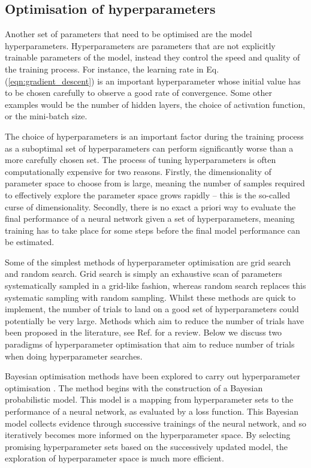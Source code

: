 \documentclass[main.tex]{subfiles}
\begin{document}
    \subsection{Optimisation of hyperparameters}
    \label{sec:hyperparameters}
    Another set of parameters that need to be optimised
    are the model hyperparameters.
    Hyperparameters are parameters that are
    not explicitly trainable parameters of the model, instead they control
    the speed and quality of the training process.
    For instance, the learning rate in Eq. ({\ref{eqn:gradient_descent}}) is
    an important hyperparameter whose initial value has
    to be chosen carefully to observe a good rate of convergence.
    Some other examples would be
    the number of hidden layers, the choice of activation
    function, or the mini-batch size.

    The choice of hyperparameters is an important
    factor during the training process as a suboptimal set
    of hyperparameters can perform significantly worse
    than a more carefully chosen set. The process of tuning
    hyperparameters is often computationally expensive for two
    reasons. Firstly, the dimensionality of parameter space to
    choose from is large, meaning the number of samples required
    to effectively explore the parameter space grows rapidly --
    this is the so-called curse of dimensionality.
    Secondly, there is no exact a priori way to evaluate the
    final performance of a neural network given a set of
    hyperparameters, meaning training has to take place for
    some steps before the final model performance can be estimated.
    
    Some of the simplest methods of hyperparameter optimisation
    are grid search and random search. Grid search is simply
    an exhaustive scan of parameters systematically sampled
    in a grid-like fashion, whereas random search replaces
    this systematic sampling with random sampling. Whilst
    these methods are quick to implement, the number of trials
    to land on a good set of hyperparameters could potentially
    be very large. Methods which aim to reduce the number
    of trials have been proposed in the literature, see Ref.
    \cite{Yu2020HyperParameterOA} for a review.
    Below we discuss two paradigms of hyperparameter optimisation
    that aim to reduce number of trials when doing hyperparameter searches.

    Bayesian optimisation methods have been explored
    to carry out hyperparameter optimisation \cite{bergstra2013making,bergstra2015hyperopt}.
    The method begins with the construction of a 
    Bayesian probabilistic model. This model is a mapping
    from hyperparameter sets to the performance
    of a neural network, as evaluated by a loss function. 
    This Bayesian model collects evidence
    through successive trainings of the neural network,
    and so iteratively becomes more informed on the hyperparameter
    space. By selecting promising hyperparameter
    sets based on the successively updated model, the exploration of
    hyperparameter space is much more efficient.
\end{document}
